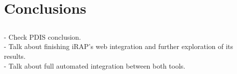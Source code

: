 \chapter{Conclusions} \label{chap:conclusion}

\section*{}

\begin{Notes}
- Check PDIS conclusion.\\
- Talk about finishing iRAP's web integration and further exploration of its
results.\\
- Talk about full automated integration between both tools.\\
\end{Notes}
